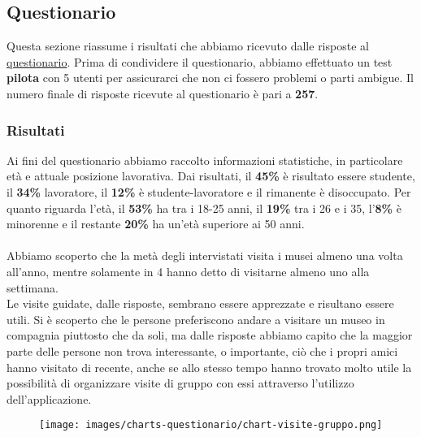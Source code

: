 \def\answers{257}

\subsection{Questionario}

Questa sezione riassume i risultati che abbiamo ricevuto dalle risposte al \href{https://docs.google.com/forms/d/1vKzFGCQb5nvyG6it8HfEqZgZ3ioQ6J1_T6eUiTdYIRc/edit}{questionario}. 
Prima di condividere il questionario, abbiamo effettuato un test \textbf{pilota} con 5 utenti per assicurarci che non ci fossero problemi o parti ambigue. Il numero finale di risposte ricevute al questionario è pari a \textbf{\answers}.

\subsubsection{Risultati}
Ai fini del questionario abbiamo raccolto informazioni statistiche, in particolare età e attuale posizione lavorativa. Dai risultati, il \textbf{45\%} è risultato essere studente, il \textbf{34\%} lavoratore, il \textbf{12\%} è studente-lavoratore e il rimanente è disoccupato. Per quanto riguarda l'età, il \textbf{53\%} ha tra i 18-25 anni, il \textbf{19\%} tra i 26 e i 35, l'\textbf{8\%} è minorenne e il restante \textbf{20\%} ha un'età superiore ai 50 anni.

\paragraph{}
Abbiamo scoperto che la metà degli intervistati visita i musei almeno una volta all'anno, mentre solamente in 4 hanno detto di visitarne almeno uno alla settimana.\\
Le visite guidate, dalle risposte, sembrano essere apprezzate e risultano essere utili. 
Si è scoperto che le persone preferiscono andare a visitare un museo in compagnia piuttosto che da soli, ma dalle risposte abbiamo capito che la maggior parte delle persone non trova interessante, o importante, ciò che i propri amici hanno visitato di recente, anche se allo stesso tempo hanno trovato molto utile la possibilità di organizzare visite di gruppo con essi attraverso l'utilizzo dell'applicazione.

\begin{figure}[ht]
    \centering
    \texttt{[image: images/charts-questionario/chart-visite-gruppo.png]}
\end{figure}

